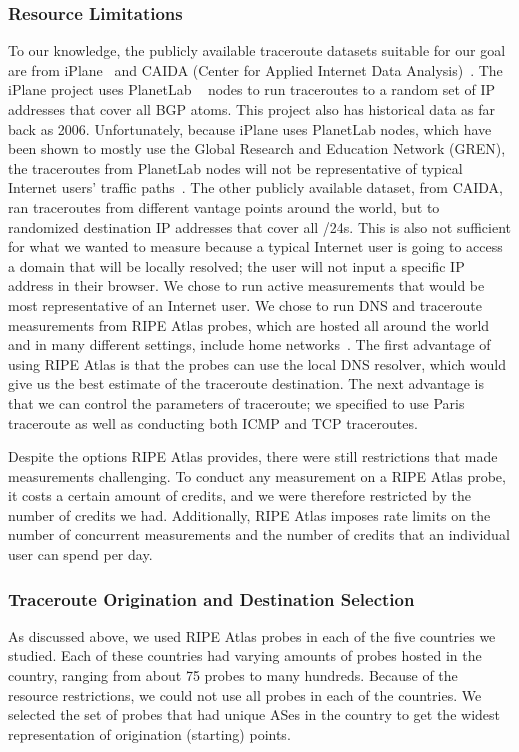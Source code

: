 \subsubsection{Resource Limitations}
To our knowledge, the publicly available traceroute datasets suitable for our goal are from iPlane~\cite{madhyastha2006iplane} and CAIDA (Center for Applied Internet Data Analysis)~\cite{caida}.  The iPlane project uses PlanetLab ~\cite{planetlab} nodes to run traceroutes to a random set of IP addresses that cover all BGP atoms.  This project also has historical data as far back as 2006.  Unfortunately, because iPlane uses PlanetLab nodes, which have been shown to mostly use the Global Research and Education Network (GREN), the traceroutes from PlanetLab nodes will not be representative of typical Internet users' traffic paths~\cite{banerjee2004interdomain}.  The other publicly available dataset, from CAIDA, ran traceroutes from different vantage points around the world, but to randomized destination IP addresses that cover all /24s.  This is also not sufficient for what we wanted to measure because a typical Internet user is going to access a domain that will be locally resolved; the user will not input a specific IP address in their browser.  We chose to run active measurements that would be most representative of an Internet user.  We chose to run DNS and traceroute measurements from RIPE Atlas probes, which are hosted all around the world and in many different settings, include home networks~\cite{ripe_atlas}.  The first advantage of using RIPE Atlas is that the probes can use the local DNS resolver, which would give us the best estimate of the traceroute destination.  The next advantage is that we can control the parameters of traceroute; we specified to use Paris traceroute as well as conducting both ICMP and TCP traceroutes. 

Despite the options RIPE Atlas provides, there were still restrictions that made measurements challenging.  To conduct any measurement on a RIPE Atlas probe, it costs a certain amount of credits, and we were therefore restricted by the number of credits we had.  Additionally, RIPE Atlas imposes rate limits on the number of concurrent measurements and the number of credits that an individual user can spend per day.

\subsubsection{Traceroute Origination and Destination Selection}
As discussed above, we used RIPE Atlas probes in each of the five countries we studied.  Each of these countries had varying amounts of probes hosted in the country, ranging from about 75 probes to many hundreds.  Because of the resource restrictions, we could not use all probes in each of the countries.  We selected the set of probes that had unique ASes in the country to get the widest representation of origination (starting) points.

